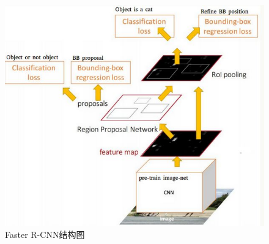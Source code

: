 \begin{figure}[h]
  \centering
  \includegraphics[width=0.7\linewidth]{Img/faster-rcnn.jpg}
  \caption{Faster R-CNN结构图\cite{ren2015faster}}
  \label{fig:faster-rcnn}
\end{figure}
